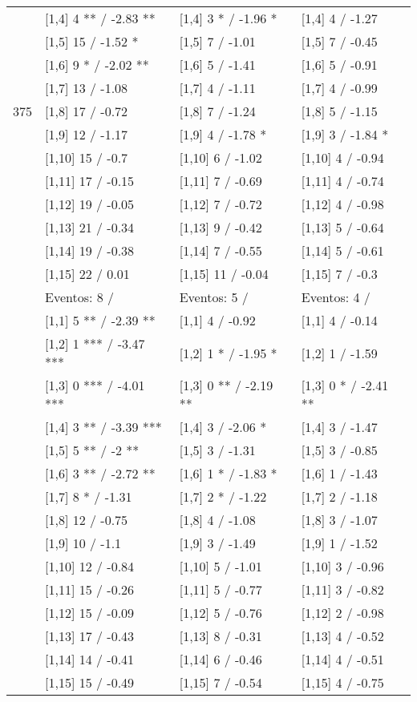 \begin{table}
\begin{tabular}[t]{llll}
\addlinespace
 & {}[1,4] 4 ** / -2.83 ** & {}[1,4] 3 * / -1.96 * & {}[1,4] 4  / -1.27\\
 & {}[1,5] 15  / -1.52 * & {}[1,5] 7  / -1.01 & {}[1,5] 7  / -0.45\\
 & {}[1,6] 9 * / -2.02 ** & {}[1,6] 5  / -1.41 & {}[1,6] 5  / -0.91\\
 & {}[1,7] 13  / -1.08 & {}[1,7] 4  / -1.11 & {}[1,7] 4  / -0.99\\
375 & {}[1,8] 17  / -0.72 & {}[1,8] 7  / -1.24 & {}[1,8] 5  / -1.15\\
\addlinespace
 & {}[1,9] 12  / -1.17 & {}[1,9] 4  / -1.78 * & {}[1,9] 3  / -1.84 *\\
 & {}[1,10] 15  / -0.7 & {}[1,10] 6  / -1.02 & {}[1,10] 4  / -0.94\\
 & {}[1,11] 17  / -0.15 & {}[1,11] 7  / -0.69 & {}[1,11] 4  / -0.74\\
 & {}[1,12] 19  / -0.05 & {}[1,12] 7  / -0.72 & {}[1,12] 4  / -0.98\\
 & {}[1,13] 21  / -0.34 & {}[1,13] 9  / -0.42 & {}[1,13] 5  / -0.64\\
\addlinespace
 & {}[1,14] 19  / -0.38 & {}[1,14] 7  / -0.55 & {}[1,14] 5  / -0.61\\
 & {}[1,15] 22  / 0.01 & {}[1,15] 11  / -0.04 & {}[1,15] 7  / -0.3\\
 & Eventos:  8 / & Eventos:  5 / & Eventos:  4 /\\
 & {}[1,1] 5 ** / -2.39 ** & {}[1,1] 4  / -0.92 & {}[1,1] 4  / -0.14\\
 & {}[1,2] 1 *** / -3.47 *** & {}[1,2] 1 * / -1.95 * & {}[1,2] 1  / -1.59\\
\addlinespace
 & {}[1,3] 0 *** / -4.01 *** & {}[1,3] 0 ** / -2.19 ** & {}[1,3] 0 * / -2.41 **\\
 & {}[1,4] 3 ** / -3.39 *** & {}[1,4] 3  / -2.06 * & {}[1,4] 3  / -1.47\\
 & {}[1,5] 5 ** / -2 ** & {}[1,5] 3  / -1.31 & {}[1,5] 3  / -0.85\\
 & {}[1,6] 3 ** / -2.72 ** & {}[1,6] 1 * / -1.83 * & {}[1,6] 1  / -1.43\\
 & {}[1,7] 8 * / -1.31 & {}[1,7] 2 * / -1.22 & {}[1,7] 2  / -1.18\\
\addlinespace
500 & {}[1,8] 12  / -0.75 & {}[1,8] 4  / -1.08 & {}[1,8] 3  / -1.07\\
 & {}[1,9] 10  / -1.1 & {}[1,9] 3  / -1.49 & {}[1,9] 1  / -1.52\\
 & {}[1,10] 12  / -0.84 & {}[1,10] 5  / -1.01 & {}[1,10] 3  / -0.96\\
 & {}[1,11] 15  / -0.26 & {}[1,11] 5  / -0.77 & {}[1,11] 3  / -0.82\\
 & {}[1,12] 15  / -0.09 & {}[1,12] 5  / -0.76 & {}[1,12] 2  / -0.98\\
\addlinespace
 & {}[1,13] 17  / -0.43 & {}[1,13] 8  / -0.31 & {}[1,13] 4  / -0.52\\
 & {}[1,14] 14  / -0.41 & {}[1,14] 6  / -0.46 & {}[1,14] 4  / -0.51\\
 & {}[1,15] 15  / -0.49 & {}[1,15] 7  / -0.54 & {}[1,15] 4  / -0.75\\
\bottomrule
\end{tabular}
\end{table}
